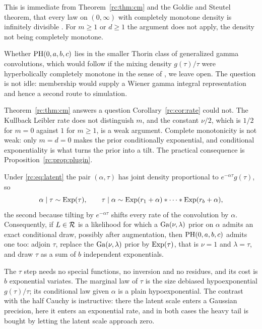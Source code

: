 This is immediate from Theorem~\ref{rc:thm:cm} and the Goldie and Steutel theorem, that every law on $(0,\infty)$ with completely monotone density is infinitely divisible \citep{rc:goldie1967,rc:steutel1967}. For $m\ge1$ or $d\ge1$ the argument does not apply, the density not being completely monotone.

Whether $\mathrm{PH}(0,a,b,c)$ lies in the smaller Thorin class of generalized gamma convolutions, which would follow if the mixing density $g(\tau)/\tau$ were hyperbolically completely monotone in the sense of \citet{rc:bondesson1992}, we leave open. The question is not idle: membership would supply a Wiener gamma integral representation and hence a second route to simulation.

Theorem~\ref{rc:thm:cm} answers a question Corollary~\ref{rc:cor:rate} could not. The Kullback Leibler rate does not distinguish $m$, and the constant $\nu/2$, which is $1/2$ for $m=0$ against $1$ for $m\ge1$, is a weak argument. Complete monotonicity is not weak: only $m=d=0$ makes the prior conditionally exponential, and conditional exponentiality is what turns the prior into a tilt. The practical consequence is Proposition~\ref{rc:prop:plugin}.

\begin{proposition}\label{rc:prop:plugin}
Under \eqref{rc:eq:latent} the pair $(\alpha,\tau)$ has joint density proportional to $e^{-\alpha\tau}g(\tau)$, so
\[
\alpha\mid\tau\sim\mathrm{Exp}(\tau),\qquad \tau\mid\alpha\sim\mathrm{Exp}(r_1+\alpha)*\dots*\mathrm{Exp}(r_b+\alpha),
\]
the second because tilting by $e^{-\alpha\tau}$ shifts every rate of the convolution by $\alpha$. Consequently, if $L\in\mathcal{R}$ is a likelihood for which a $\mathrm{Ga}(\nu,\lambda)$ prior on $\alpha$ admits an exact conditional draw, possibly after augmentation, then $\mathrm{PH}(0,a,b,c)$ admits one too: adjoin $\tau$, replace the $\mathrm{Ga}(\nu,\lambda)$ prior by $\mathrm{Exp}(\tau)$, that is $\nu=1$ and $\lambda=\tau$, and draw $\tau$ as a sum of $b$ independent exponentials.
\end{proposition}

The $\tau$ step needs no special functions, no inversion and no residues, and its cost is $b$ exponential variates. The marginal law of $\tau$ is the size debiased hypoexponential $g(\tau)/\tau$; its conditional law given $\alpha$ is a plain hypoexponential. The contrast with the half Cauchy is instructive: there the latent scale enters a Gaussian precision, here it enters an exponential rate, and in both cases the heavy tail is bought by letting the latent scale approach zero.

